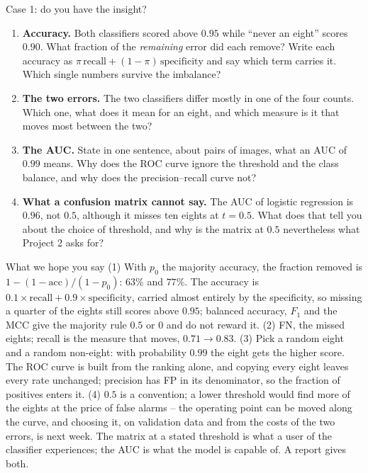 \documentclass[10pt,aspectratio=169]{beamer}
\newcounter{insight}
\begin{document}
\begin{frame}{Case 1: do you have the insight?}
\scriptsize
\vspace{-3pt}
\begin{enumerate}
  \item \textbf{Accuracy.}  Both classifiers scored above $0.95$ while
        ``never an eight'' scores $0.90$.  What fraction of the
        \emph{remaining} error did each remove?  Write each accuracy as
        $\pi\,\mathrm{recall}+(1-\pi)\,\mathrm{specificity}$ and say which
        term carries it.  Which single numbers survive the imbalance?
  \item \textbf{The two errors.}  The two classifiers differ mostly in one
        of the four counts.  Which one, what does it mean for an eight, and
        which measure is it that moves most between the two?
  \item \textbf{The AUC.}  State in one sentence, about pairs of images,
        what an AUC of $0.99$ means.  Why does the ROC curve ignore the
        threshold and the class balance, and why does the precision--recall
        curve not?
  \item \textbf{What a confusion matrix cannot say.}  The AUC of logistic
        regression is $0.96$, not $0.5$, although it misses ten eights at
        $t=0.5$.  What does that tell you about the choice of threshold, and
        why is the matrix at $0.5$ nevertheless what Project 2 asks for?
\end{enumerate}
\pause
\begin{block}{What we hope you say}
\scriptsize
(1) With $p_0$ the majority accuracy, the fraction removed is
$1-(1-\mathrm{acc})/(1-p_0)$: $63\%$ and $77\%$.  The accuracy is
$0.1\times\mathrm{recall}+0.9\times\mathrm{specificity}$, carried almost
entirely by the specificity, so missing a quarter of the eights still
scores above $0.95$; balanced accuracy, $F_1$ and the MCC give the majority
rule $0.5$ or $0$ and do not reward it.
(2) FN, the missed eights; recall is the measure that moves,
$0.71\to0.83$.
(3) Pick a random eight and a random non-eight: with probability $0.99$
the eight gets the higher score.  The ROC curve is built from the ranking
alone, and copying every eight leaves every rate unchanged; precision has
FP in its denominator, so the fraction of positives enters it.
(4) $0.5$ is a convention; a lower threshold would find more of the eights
at the price of false alarms -- the operating point can be moved along the
curve, and choosing it, on validation data and from the costs of the two
errors, is next week.  The matrix at a stated threshold is what a user of
the classifier experiences; the AUC is what the model is capable of.  A
report gives both.
\end{block}
\end{frame}
\end{document}
